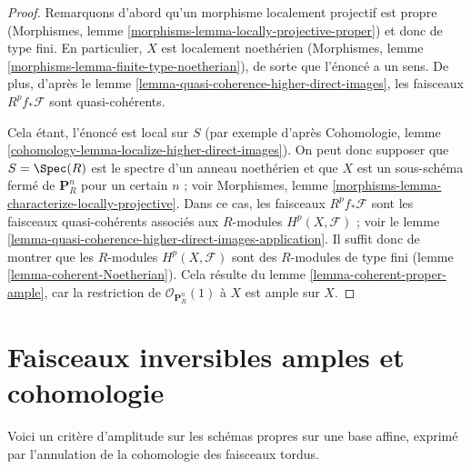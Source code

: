 \begin{proof}
Remarquons d'abord qu'un morphisme localement projectif est propre
(Morphismes, lemme \ref{morphisms-lemma-locally-projective-proper})
et donc de type fini.
En particulier, $X$ est localement noethérien
(Morphismes, lemme \ref{morphisms-lemma-finite-type-noetherian}),
de sorte que l'énoncé a un sens. De
plus, d'après le lemme \ref{lemma-quasi-coherence-higher-direct-images},
les faisceaux $R^pf_*\mathcal{F}$ sont quasi-cohérents.

\medskip\noindent
Cela étant, l'énoncé est local sur $S$ (par exemple d'après
Cohomologie, lemme \ref{cohomology-lemma-localize-higher-direct-images}).
On peut donc supposer que $S = \Spec(R)$ est le spectre d'un
anneau noethérien et que $X$ est un sous-schéma fermé de
$\mathbf{P}^n_R$ pour un certain $n$ ; voir
Morphismes, lemme \ref{morphisms-lemma-characterize-locally-projective}.
Dans ce cas, les faisceaux $R^pf_*\mathcal{F}$ sont les faisceaux
quasi-cohérents associés aux $R$-modules $H^p(X, \mathcal{F})$ ; voir le
lemme \ref{lemma-quasi-coherence-higher-direct-images-application}.
Il suffit donc de montrer que les $R$-modules $H^p(X, \mathcal{F})$
sont des $R$-modules de type fini (lemme \ref{lemma-coherent-Noetherian}).
Cela résulte du lemme \ref{lemma-coherent-proper-ample},
car la restriction de $\mathcal{O}_{\mathbf{P}^n_R}(1)$
à $X$ est ample sur $X$.
\end{proof}








\section{Faisceaux inversibles amples et cohomologie}
\label{section-ample-cohomology}

\noindent
Voici un critère d'amplitude sur les schémas propres sur une base affine,
exprimé par l'annulation de la cohomologie des faisceaux tordus.


